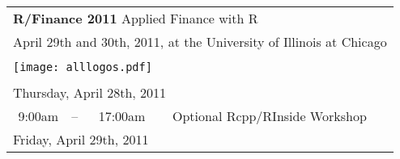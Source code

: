 \documentclass[11pt]{article}
\newcommand{\ra}[1]{\renewcommand{\arraystretch}{#1}}  %
\newcommand{\mylinecolor}[1]{\color{#1}\vspace{-8pt}}  %
\begin{document}
\thispagestyle{empty}


\ra{1.05} \sf

\begin{tabular}{rlrlp{5in}} %

  \multicolumn{5}{l}{\Huge \textbf{\color{KeynoteTalk} R/Finance 2011} \huge \phantom{i} Applied Finance with R} \\
  \multicolumn{5}{l}{\large \color{Breaks} April 29th and 30th, 2011, at the University of Illinois at Chicago} \\[3pt]

  \bottomrule \\

  \multicolumn{5}{l}{
    \centering
    \texttt{[image: alllogos.pdf]}
  } \\[5pt]

  \bottomrule \\[3pt]

  \multicolumn{5}{l}{\large \color{Breaks} Thursday, April 28th, 2011} \\
  \color{Breaks} 9:00am & \color{Breaks}-- & \color{Breaks} 17:00am &   & \small{\mylinecolor{Breaks} Optional Rcpp/RInside Workshop} \\[12pt]

  \multicolumn{5}{l}{\large Friday, April 29th, 2011} \\


\end{tabular}
\end{document}
